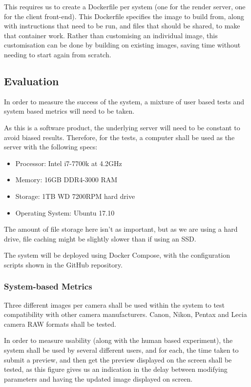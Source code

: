 \documentclass[12pt,a4paper]{article}
\begin{document}
This requires us to create a Dockerfile per system (one for the render server,
one for the client front-end). This Dockerfile specifies the image to build from,
along with instructions that need to be run, and files that should be shared, to make
that container work. Rather than customising an individual image, this customisation can be done
by building on existing images, saving time without needing to start again from scratch. \cite{DockerWhyItsUseful}

\subsection{Evaluation}
In order to measure the success of the system, a mixture of user based tests and system
based metrics will need to be taken.

As this is a software product, the underlying server will need to be constant to avoid
biased results. Therefore, for the tests, a computer shall be used as the server with the
following specs:

\begin{itemize}
  \item Processor: Intel i7-7700k at 4.2GHz
  \item Memory: 16GB DDR4-3000 RAM
  \item Storage: 1TB WD 7200RPM hard drive
  \item Operating System: Ubuntu 17.10
\end{itemize}

The amount of file storage here isn't as important, but as we are using a hard drive,
file caching might be slightly slower than if using an SSD.

The system will be deployed using Docker Compose, with the configuration scripts shown in the GitHub
repository.

\subsubsection{System-based Metrics}
Three different images per camera shall be used within the system to test compatibility
with other camera manufacturers. Canon, Nikon, Pentax and Lecia camera RAW formats shall be tested.

In order to measure usability (along with the human based experiment), the system shall be used by
several different users, and for each, the time taken to submit a preview, and then get the preview displayed
on the screen shall be tested, as this figure gives us an indication in the delay between modifying parameters
and having the updated image displayed on screen.
\end{document}

